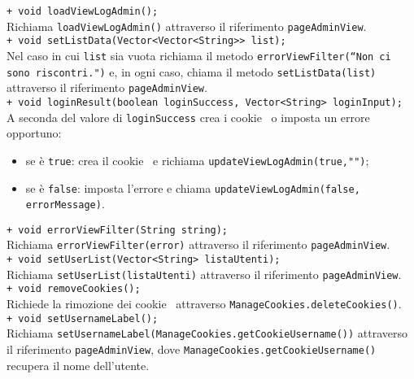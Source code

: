 {\begin{sloppypar}
{\begin{itemize}
\begin{itemize}
					\texttt{+ void loadViewLogAdmin();}\\
					Richiama \texttt{loadViewLogAdmin()} attraverso il riferimento \texttt{pageAdminView}.\\
					
					\texttt{+ void setListData(Vector<Vector<String>> list);}\\
					Nel caso in cui \texttt{list} sia vuota richiama il metodo  \texttt{errorViewFilter(“Non ci sono riscontri.")} e, in ogni caso, chiama il metodo  \texttt{setListData(list)} attraverso il riferimento  \texttt{pageAdminView}.\\
					
					\texttt{+ void loginResult(boolean loginSuccess, Vector<String> loginInput);}\\
					A seconda del valore di \texttt{loginSuccess} crea i cookie\g~ o imposta un errore opportuno:
					\begin{itemize}
						\item se è \texttt{true}: crea il cookie\g~ e richiama \texttt{updateViewLogAdmin(true,"")};
						\item se è \texttt{false}: imposta l’errore e chiama \texttt{updateViewLogAdmin(false, errorMessage)}.\\
					\end{itemize}

					\texttt{+ void errorViewFilter(String string);}\\
					Richiama \texttt{errorViewFilter(error)} attraverso il riferimento \texttt{pageAdminView}.\\
					
					\texttt{+ void setUserList(Vector<String> listaUtenti);}\\
					Richiama \texttt{setUserList(listaUtenti)} attraverso il riferimento \texttt{pageAdminView}.\\
					
					\texttt{+ void removeCookies();}\\
					Richiede la rimozione dei cookie\g~ attraverso \texttt{ManageCookies.deleteCookies()}.\\
					
					\texttt{+ void setUsernameLabel();}\\
					Richiama \texttt{setUsernameLabel(ManageCookies.getCookieUsername())} attraverso il riferimento \texttt{pageAdminView}, dove \texttt{ManageCookies.getCookieUsername()} recupera il nome dell’utente.\\
					
			\end{itemize}
		
		\end{itemize}
	}
\end{sloppypar}
}
